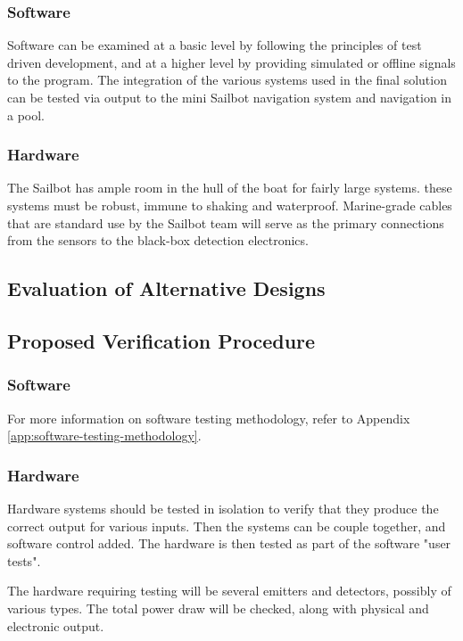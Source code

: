 \subsubsection{\label{sec:method:proposed-analysis:software}Software}
Software can be examined at a basic level by following the principles of test driven development, and at a higher level by providing simulated or offline signals to the program. The integration of the various systems used in the final solution can be tested via output to the mini Sailbot navigation system and navigation in a pool.

\subsubsection{\label{sec:method:proposed-analysis:hardware}Hardware}
The Sailbot has ample room in the hull of the boat for fairly large systems. these systems must be robust, immune to shaking and waterproof. Marine-grade cables that are standard use by the Sailbot team will serve as the primary connections from the sensors to the black-box detection electronics.


\subsection{\label{sec:method:evaluation-of-alternative-designs}Evaluation of Alternative Designs}

\subsection{\label{sec:method:proposed-verification-procedure}Proposed Verification Procedure}

\subsubsection{\label{sec:method:proposed-verification-procedure:software}Software}
For more information on software testing methodology, refer to Appendix \ref{app:software-testing-methodology}.

\subsubsection{\label{sec:method:proposed-verification-procedure:hardware}Hardware}
Hardware systems should be tested in isolation to verify that they produce the correct output for various inputs. Then the systems can be couple together, and software control added. The hardware is then tested as part of the software "user tests".

The hardware requiring testing will be several emitters and detectors, possibly of various types. The total power draw will be checked, along with physical and electronic output.

